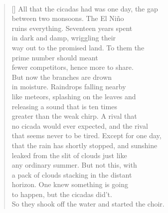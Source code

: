 \documentclass{book}
\begin{document}
\poemtitle{\textcolor[RGB]{165,15,15}{All that the cicadas had was one day}}
\hspace*{\fill} \\
\settowidth{\versewidth}{So they shook off the water and started the choir.}
\begin{verse}[\versewidth]
    All that the cicadas had was one day, the gap \\
    between two monsoons. The El Niño \\
    ruins everything. Seventeen years spent \\
    in dark and damp, wriggling their \\
    way out to the promised land. To them the\\
    prime number should meant \\
    fewer competitors, hence more to share. \\
    But now the branches are drown \\
    in moisture. Raindrops falling nearby \\
    like meteors, splashing on the leaves and\\
    releasing a sound that is ten times\\
    greater than the weak chirp. A rival that\\
    no cicada would ever expected, and the rival\\
    that seems never to be tired. Except for one day,\\
    that the rain has shortly stopped, and sunshine \\
    leaked from the slit of clouds just like\\
    any ordinary summer. But not this, with\\
    a pack of clouds stacking in the distant \\
    horizon. One knew something is going \\
    to happen, but the cicadas did't. \\
    So they shook off the water and started the choir.
\end{verse}
\end{document}

